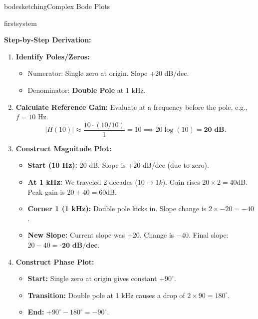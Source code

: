 \begin{mainquestion}{bodesketching}{Complex Bode Plots}
\begin{partquestion}{firstsystem}
\begin{answer}

    \textbf{Step-by-Step Derivation:}
    \begin{enumerate}
        \item \textbf{Identify Poles/Zeros:}
        \begin{itemize}
            \item Numerator: Single zero at origin. Slope $+20$ dB/dec.
            \item Denominator: \textbf{Double Pole} at $1$ kHz.
        \end{itemize}
        
        \item \textbf{Calculate Reference Gain:}
        Evaluate at a frequency before the pole, e.g., $f=10$ Hz.
        \[ |H(10)| \approx \frac{10 \cdot (10/10)}{1} = 10 \implies 20\log(10) = \textbf{20 dB}. \]
        
        \item \textbf{Construct Magnitude Plot:}
        \begin{itemize}
            \item \textbf{Start (10 Hz):} 20 dB. Slope is $+20$ dB/dec (due to zero).
            \item \textbf{At 1 kHz:} We traveled 2 decades ($10 \to 1k$). Gain rises $20 \times 2 = 40$dB. Peak gain is $20+40=60$dB.
            \item \textbf{Corner 1 (1 kHz):} Double pole kicks in. Slope change is $2 \times -20 = -40$.
            \item \textbf{New Slope:} Current slope was $+20$. Change is $-40$. Final slope: $20 - 40 = \textbf{-20 dB/dec}$.
        \end{itemize}

        \item \textbf{Construct Phase Plot:}
        \begin{itemize}
            \item \textbf{Start:} Single zero at origin gives constant $+90^\circ$.
            \item \textbf{Transition:} Double pole at 1 kHz causes a drop of $2 \times 90 = 180^\circ$.
            \item \textbf{End:} $+90^\circ - 180^\circ = -90^\circ$.
        \end{itemize}
    \end{enumerate}
\end{answer}


\end{partquestion}
\end{mainquestion}
